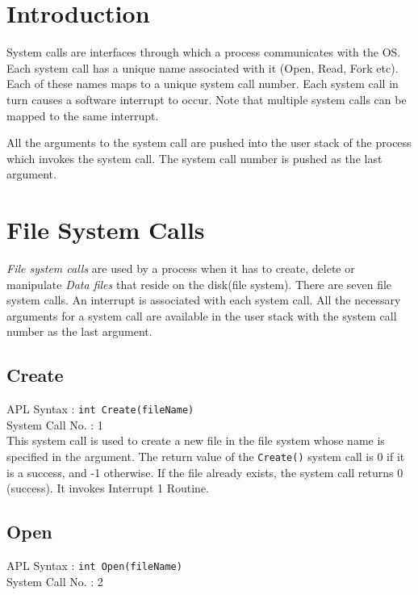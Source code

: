 \documentclass[10pt]{report}
\newcounter{syscall}
\begin{document}
\section{Introduction}
System calls are interfaces through which a process communicates with the OS. Each system call has a unique name associated with it (Open, Read, Fork etc). Each of these names maps to a unique system call number. Each system call in turn causes a software interrupt to occur. Note that multiple system calls can be mapped to the same interrupt.

All the arguments to the system call are pushed into the user stack of the process which invokes the system call. The system call number is pushed as the last argument. 


\section{File System Calls}
\label{sec:fssyscall}
\textit{File system calls} are used by a process when it has to create, delete or manipulate \textit{Data files} that reside on the disk(file system). There are seven file system calls. An interrupt is associated with each system call. All the necessary arguments for a system call are available in the user stack with the system call number as the last argument.\\

\subsection{Create}
\label{sec:create()}

APL Syntax : \texttt{int Create(fileName)} \\
System Call No. : 1 \\

This system call is used to create a new file in the file system whose name is specified in the argument. The return value of the \texttt{Create()} system call is 0 if it is a success, and -1 otherwise. If the file already exists, the system call returns 0 (success). It invokes Interrupt 1 Routine.\\


\subsection{Open}
\label{sec:open()}

APL Syntax : \texttt{int Open(fileName)} \\
System Call No. : 2 \\
\end{document}
